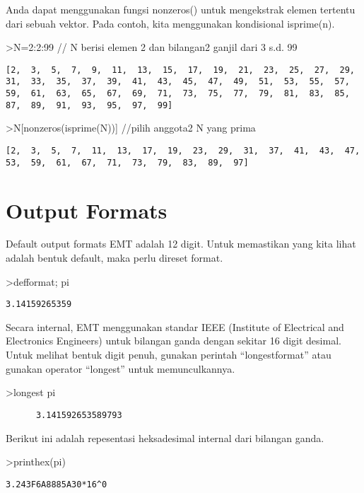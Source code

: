 \documentclass[
]{book}
\begin{document}
Anda dapat menggunakan fungsi nonzeros() untuk mengekstrak elemen tertentu dari sebuah vektor. Pada contoh, kita menggunakan kondisional isprime(n).

\textgreater N=2:2:99 // N berisi elemen 2 dan bilangan2 ganjil dari 3 s.d. 99

\begin{verbatim}
[2,  3,  5,  7,  9,  11,  13,  15,  17,  19,  21,  23,  25,  27,  29,
31,  33,  35,  37,  39,  41,  43,  45,  47,  49,  51,  53,  55,  57,
59,  61,  63,  65,  67,  69,  71,  73,  75,  77,  79,  81,  83,  85,
87,  89,  91,  93,  95,  97,  99]
\end{verbatim}

\textgreater N{[}nonzeros(isprime(N)){]} //pilih anggota2 N yang prima

\begin{verbatim}
[2,  3,  5,  7,  11,  13,  17,  19,  23,  29,  31,  37,  41,  43,  47,
53,  59,  61,  67,  71,  73,  79,  83,  89,  97]
\end{verbatim}

\section{Output Formats}\label{output-formats}

Default output formats EMT adalah 12 digit. Untuk memastikan yang kita lihat adalah bentuk default, maka perlu direset format.

\textgreater defformat; pi

\begin{verbatim}
3.14159265359
\end{verbatim}

Secara internal, EMT menggunakan standar IEEE (Institute of Electrical and Electronics Engineers) untuk bilangan ganda dengan sekitar 16 digit desimal. Untuk melihat bentuk digit penuh, gunakan perintah ``longestformat'' atau gunakan operator ``longest'' untuk memunculkannya.

\textgreater longest pi

\begin{verbatim}
      3.141592653589793 
\end{verbatim}

Berikut ini adalah repesentasi heksadesimal internal dari bilangan ganda.

\textgreater printhex(pi)

\begin{verbatim}
3.243F6A8885A30*16^0
\end{verbatim}
\end{document}
